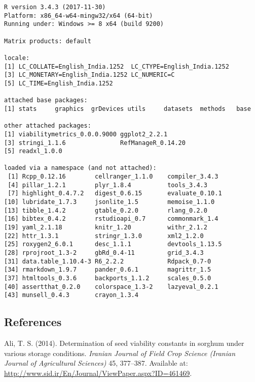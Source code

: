 \documentclass[]{article}
\begin{document}
\begin{verbatim}
R version 3.4.3 (2017-11-30)
Platform: x86_64-w64-mingw32/x64 (64-bit)
Running under: Windows >= 8 x64 (build 9200)

Matrix products: default

locale:
[1] LC_COLLATE=English_India.1252  LC_CTYPE=English_India.1252   
[3] LC_MONETARY=English_India.1252 LC_NUMERIC=C                  
[5] LC_TIME=English_India.1252    

attached base packages:
[1] stats     graphics  grDevices utils     datasets  methods   base     

other attached packages:
[1] viabilitymetrics_0.0.0.9000 ggplot2_2.2.1              
[3] stringi_1.1.6               RefManageR_0.14.20         
[5] readxl_1.0.0               

loaded via a namespace (and not attached):
 [1] Rcpp_0.12.16        cellranger_1.1.0    compiler_3.4.3     
 [4] pillar_1.2.1        plyr_1.8.4          tools_3.4.3        
 [7] highlight_0.4.7.2   digest_0.6.15       evaluate_0.10.1    
[10] lubridate_1.7.3     jsonlite_1.5        memoise_1.1.0      
[13] tibble_1.4.2        gtable_0.2.0        rlang_0.2.0        
[16] bibtex_0.4.2        rstudioapi_0.7      commonmark_1.4     
[19] yaml_2.1.18         knitr_1.20          withr_2.1.2        
[22] httr_1.3.1          stringr_1.3.0       xml2_1.2.0         
[25] roxygen2_6.0.1      desc_1.1.1          devtools_1.13.5    
[28] rprojroot_1.3-2     gbRd_0.4-11         grid_3.4.3         
[31] data.table_1.10.4-3 R6_2.2.2            Rdpack_0.7-0       
[34] rmarkdown_1.9.7     pander_0.6.1        magrittr_1.5       
[37] htmltools_0.3.6     backports_1.1.2     scales_0.5.0       
[40] assertthat_0.2.0    colorspace_1.3-2    lazyeval_0.2.1     
[43] munsell_0.4.3       crayon_1.3.4       
\end{verbatim}

\hypertarget{references}{%
\subsection*{References}\label{references}}

\hypertarget{refs}{}
\leavevmode\hypertarget{ref-ali_determination_2014}{}%
Ali, T. S. (2014). Determination of seed viability constants in sorghum
under various storage conditions. \emph{Iranian Journal of Field Crop
Science (Iranian Journal of Agricultural Sciences)} 45, 377--387.
Available at:
\url{http://www.sid.ir/En/Journal/ViewPaper.aspx?ID=461469}.
\end{document}
